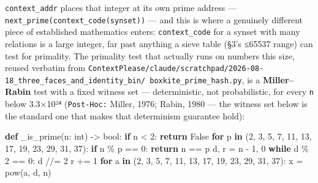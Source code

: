 \documentclass[
  10pt,
]{article}
\newenvironment{Shaded}{}{}
\newcommand{\BuiltInTok}[1]{\textcolor[rgb]{0.00,0.50,0.00}{#1}}
\newcommand{\ControlFlowTok}[1]{\textcolor[rgb]{0.00,0.44,0.13}{\textbf{#1}}}
\newcommand{\DecValTok}[1]{\textcolor[rgb]{0.25,0.63,0.44}{#1}}
\newcommand{\KeywordTok}[1]{\textcolor[rgb]{0.00,0.44,0.13}{\textbf{#1}}}
\newcommand{\NormalTok}[1]{#1}
\newcommand{\OperatorTok}[1]{\textcolor[rgb]{0.40,0.40,0.40}{#1}}
\newcommand{\VariableTok}[1]{\textcolor[rgb]{0.10,0.09,0.49}{#1}}
\begin{document}
\texttt{context\_addr} places that integer at its own prime address ---
\texttt{next\_prime(context\_code(synset))} --- and this is where a
genuinely different piece of established mathematics enters:
\texttt{context\_code} for a synset with many relations is a large
integer, far past anything a sieve table (§3's ≤65537 range) can test
for primality. The primality test that actually runs on numbers this
size, reused verbatim from
\texttt{ContextPlease/claude/scratchpad/2026-08-18\_three\_faces\_and\_identity\_bin/\ boxkite\_prime\_hash.py},
is a \textbf{Miller--Rabin} test with a fixed witness set ---
deterministic, not probabilistic, for every \texttt{n} below 3.3×10²⁴
(\texttt{Post-Hoc:} Miller, 1976; Rabin, 1980 --- the witness set below
is the standard one that makes that determinism guarantee hold):

\begin{Shaded}
\begin{Highlighting}[]
\KeywordTok{def}\NormalTok{ \_is\_prime(n: }\BuiltInTok{int}\NormalTok{) }\OperatorTok{{-}\textgreater{}} \BuiltInTok{bool}\NormalTok{:}
    \ControlFlowTok{if}\NormalTok{ n }\OperatorTok{\textless{}} \DecValTok{2}\NormalTok{:}
        \ControlFlowTok{return} \VariableTok{False}
    \ControlFlowTok{for}\NormalTok{ p }\KeywordTok{in}\NormalTok{ (}\DecValTok{2}\NormalTok{, }\DecValTok{3}\NormalTok{, }\DecValTok{5}\NormalTok{, }\DecValTok{7}\NormalTok{, }\DecValTok{11}\NormalTok{, }\DecValTok{13}\NormalTok{, }\DecValTok{17}\NormalTok{, }\DecValTok{19}\NormalTok{, }\DecValTok{23}\NormalTok{, }\DecValTok{29}\NormalTok{, }\DecValTok{31}\NormalTok{, }\DecValTok{37}\NormalTok{):}
        \ControlFlowTok{if}\NormalTok{ n }\OperatorTok{\%}\NormalTok{ p }\OperatorTok{==} \DecValTok{0}\NormalTok{:}
            \ControlFlowTok{return}\NormalTok{ n }\OperatorTok{==}\NormalTok{ p}
\NormalTok{    d, r }\OperatorTok{=}\NormalTok{ n }\OperatorTok{{-}} \DecValTok{1}\NormalTok{, }\DecValTok{0}
    \ControlFlowTok{while}\NormalTok{ d }\OperatorTok{\%} \DecValTok{2} \OperatorTok{==} \DecValTok{0}\NormalTok{:}
\NormalTok{        d }\OperatorTok{//=} \DecValTok{2}
\NormalTok{        r }\OperatorTok{+=} \DecValTok{1}
    \ControlFlowTok{for}\NormalTok{ a }\KeywordTok{in}\NormalTok{ (}\DecValTok{2}\NormalTok{, }\DecValTok{3}\NormalTok{, }\DecValTok{5}\NormalTok{, }\DecValTok{7}\NormalTok{, }\DecValTok{11}\NormalTok{, }\DecValTok{13}\NormalTok{, }\DecValTok{17}\NormalTok{, }\DecValTok{19}\NormalTok{, }\DecValTok{23}\NormalTok{, }\DecValTok{29}\NormalTok{, }\DecValTok{31}\NormalTok{, }\DecValTok{37}\NormalTok{):}
\NormalTok{        x }\OperatorTok{=} \BuiltInTok{pow}\NormalTok{(a, d, n)}

\end{Highlighting}
\end{Shaded}
\end{document}
